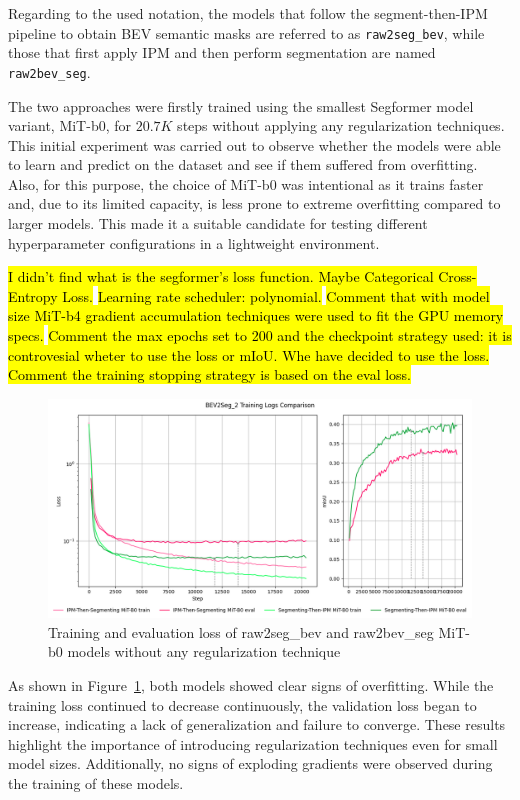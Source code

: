 Regarding to the used notation, the models that follow the segment-then-IPM pipeline to obtain BEV semantic masks are referred to as \texttt{raw2seg\_bev}, while those that first apply IPM and then perform segmentation are named \texttt{raw2bev\_seg}.

The two approaches were firstly trained using the smallest Segformer model variant, MiT-b0, for $20.7K$ steps without applying any regularization techniques. This initial experiment was carried out to observe whether the models were able to learn and predict on the dataset and see if them suffered from overfitting. Also, for this purpose, the choice of MiT-b0 was intentional as it trains faster and, due to its limited capacity, is less prone to extreme overfitting compared to larger models. This made it a suitable candidate for testing different hyperparameter configurations in a lightweight environment.

\hl{I didn't find what is the segformer's loss function. Maybe Categorical Cross-Entropy Loss.}
\hl{Learning rate scheduler: polynomial.}
\hl{Comment that with model size MiT-b4 gradient accumulation techniques were used to fit the GPU memory specs.}
\hl{Comment the max epochs set to 200 and the checkpoint strategy used: it is controvesial wheter to use the loss or mIoU. Whe have decided to use the loss.}
\hl{Comment the training stopping strategy is based on the eval loss.}

\begin{figure}[h!]
    \centering
    \includegraphics[width=0.7\linewidth]{./images/experiments/overfitting_bev_nu.png}
    \caption{Training and evaluation loss of raw2seg\_bev and raw2bev\_seg MiT-b0 models without any regularization technique}
    \label{fig:overfitting_mit-b0}
\end{figure}

As shown in Figure~\ref{fig:overfitting_mit-b0}, both models showed clear signs of overfitting. While the training loss continued to decrease continuously, the validation loss began to increase, indicating a lack of generalization and failure to converge. These results highlight the importance of introducing regularization techniques even for small model sizes. Additionally, no signs of exploding gradients were observed during the training of these models.

